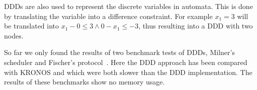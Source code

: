 DDDs are also used to represent the discrete variables in automata. This is done by translating the variable into a difference constraint. For example $x_1 = 3$ will be translated into $x_1 - 0 \leq 3 \wedge 0 - x_1 \leq -3$, thus resulting into a DDD with two nodes. 

So far we only found the results of two benchmark tests of DDDs, Milner's scheduler and Fischer's protocol~\cite{Møller200253}. Here the DDD approach has been compared with KRONOS and \uppaal{} which were both slower than the DDD implementation. The results of these benchmarks show no memory usage.  
